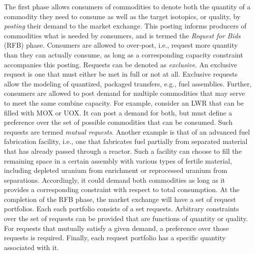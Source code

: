 The first phase allows consumers of commodities to denote both the quantity of a
commodity they need to consume as well as the target isotopics, or quality, by
\textit{posting} their demand to the market exchange. This posting informs
producers of commodities what is needed by consumers, and is termed the
\textit{Request for Bids} (RFB) phase. Consumers are allowed to over-post, i.e.,
request more quantity than they can actually consume, as long as a corresponding
capacity constraint accompanies this posting. Requests can be denoted as
\textit{exclusive}. An exclusive request is one that must either be met in full
or not at all. Exclusive requests allow the modeling of quantized, packaged
transfers, e.g., fuel assemblies. Further, consumers are allowed to post demand
for multiple commodities that may serve to meet the same combine capacity. For
example, consider an LWR that can be filled with MOX or UOX. It can post a
demand for both, but must define a preference over the set of possible
commodities that can be consumed. Such requests are termed \textit{mutual
  requests}. Another example is that of an advanced fuel fabrication facility,
i.e., one that fabricates fuel partially from separated material that has
already passed through a reactor. Such a facility can choose to fill the
remaining space in a certain assembly with various types of fertile material,
including depleted uranium from enrichment or reprocessed uranium from
separations. Accordingly, it could demand both commodities as long as it
provides a corresponding constraint with respect to total consumption. At the
completion of the RFB phase, the market exchange will have a set of request
portfolios. Each each portfolio consists of a set requests. Arbitrary
constraints over the set of requests can be provided that are functions of
quantity or quality.  For requests that mutually satisfy a given demand, a
preference over those requests is required. Finally, each request portfolio has
a specific quantity associated with it.

